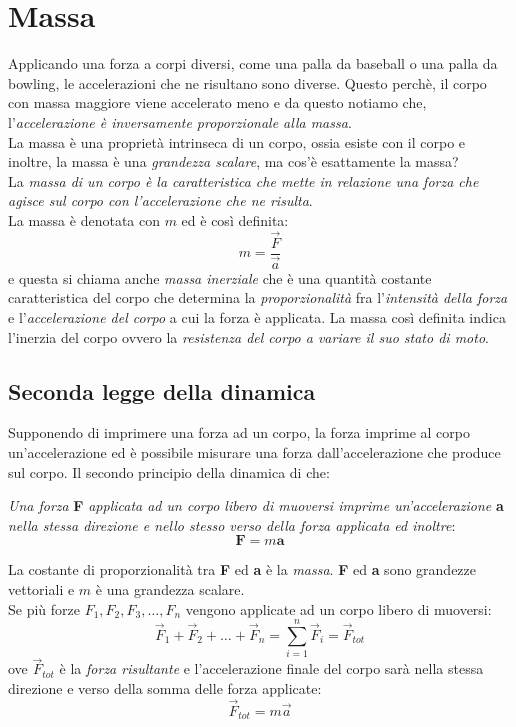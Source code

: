 \documentclass[12pt]{report}
\begin{document}
	\section{Massa}
	Applicando una forza a corpi diversi, come una palla da baseball o una palla da bowling, le accelerazioni che ne risultano sono diverse. Questo perchè, il corpo con massa maggiore viene accelerato meno e da questo notiamo che, l'\textit{accelerazione è inversamente proporzionale alla massa}. \\
	La massa è una proprietà intrinseca di un corpo, ossia esiste con il corpo e inoltre, la massa è una \textit{grandezza scalare}, ma cos'è esattamente la massa? \\
	La \textit{massa di un corpo è la caratteristica che mette in relazione una forza che agisce sul corpo con l'accelerazione che ne risulta}. \\
	La massa è denotata con $m$ ed è così definita:
	\[
	m = \dfrac{\vec{F}}{\vec{a}}
	\]
	e questa si chiama anche \textit{massa inerziale} che è una quantità costante caratteristica del corpo che determina la \textit{proporzionalità} fra l'\textit{intensità della forza} e l'\textit{accelerazione del corpo} a cui la forza è applicata. La massa così definita indica l'inerzia del corpo ovvero la \textit{resistenza del corpo a variare il suo stato di moto}.
	\subsection{Seconda legge della dinamica} Supponendo di imprimere una forza ad un corpo, la forza imprime al corpo un'accelerazione ed è  possibile misurare una forza dall'accelerazione che produce sul corpo.
	Il secondo principio della dinamica di che:
	\begin{center}
		\textit{Una forza }\textbf{F} \textit{applicata ad un corpo libero di muoversi imprime un'accelerazione} \textbf{a} \textit{nella stessa direzione e nello stesso verso della forza applicata ed inoltre}:
		\[
		\mathbf{F} = m\mathbf{a}
		\]
	\end{center}
	La costante di proporzionalità tra \textbf{F} ed \textbf{a} è  la \textit{massa}. \textbf{F} ed \textbf{a} sono grandezze vettoriali e $m$ è  una grandezza scalare. \\
	Se più forze $F_1, F_2, F_3, \dots, F_n$ vengono applicate ad un corpo libero di muoversi:
	\[
	\vec{F}_1 + \vec{F}_2 + \dots + \vec{F}_n = \sum_{i=1}^{n}\vec{F}_i = \vec{F}_{tot}
	\]
	ove $\vec{F}_{tot}$ è la \textit{forza risultante} e l'accelerazione finale del corpo sarà nella stessa direzione e verso della somma delle forza applicate:
	\[
	\vec{F}_{tot} = m\vec{a}
	\]
\end{document}
